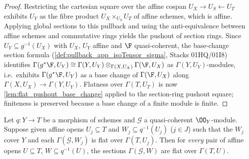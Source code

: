 \begin{proof}
  \leanok
  Restricting the cartesian square over the affine cospan
  \(U_X \to U_S \leftarrow U_T\) exhibits \(U_Y\) as the fibre product
  \(U_X \times_{U_S} U_T\) of affine schemes, which is affine.  Applying
  global sections to this pullback and using the anti-equivalence between
  affine schemes and commutative rings yields the pushout of section rings.
  Since \(U_Y \subseteq g^{-1}(U_X)\) with \(U_X\), \(U_Y\) affine and
  \(\F\) quasi-coherent, the base-change section formula
  (\cref{def:pullback_app_isoTensor_sigma}, Stacks 01HQ/01I8) identifies
  \(\Gamma(g^* \F, U_Y) \cong
    \Gamma(Y, U_Y) \otimes_{\Gamma(X, U_X)} \Gamma(\F, U_X)\)
  as \(\Gamma(Y, U_Y)\)-modules, i.e.\ exhibits \(\Gamma(g^*\F, U_Y)\) as a
  base change of \(\Gamma(\F, U_X)\) along
  \(\Gamma(X, U_X) \to \Gamma(Y, U_Y)\).  Flatness over \(\Gamma(T, U_T)\)
  is now \cref{lem:flat_pushout_base_change} applied to the section-ring
  pushout square; finiteness is preserved because a base change of a finite
  module is finite.
\end{proof}

\begin{lemma}

\leanok
  \label{lem:flat_affine_local}
  Let \(q : Y \to T\) be a morphism of schemes and \(\mathcal G\) a quasi-coherent
  \(\OO_Y\)-module.  Suppose given affine opens
  \(U_j \subseteq T\) and \(W_j \subseteq q^{-1}(U_j)\) (\(j \in J\)) such
  that the \(W_j\) cover \(Y\) and each \(\Gamma(\mathcal G, W_j)\) is flat over
  \(\Gamma(T, U_j)\).  Then for \emph{every} pair of affine opens
  \(U \subseteq T\), \(W \subseteq q^{-1}(U)\), the sections
  \(\Gamma(\mathcal G, W)\) are flat over \(\Gamma(T, U)\).
\end{lemma}

